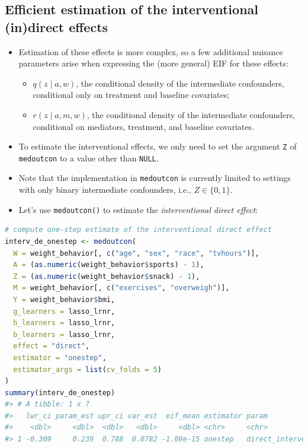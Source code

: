 \documentclass[
  12pt,
]{book}
\newcommand{\passthrough}[1]{#1}
\providecommand{\tightlist}{%
  \setlength{\itemsep}{0pt}\setlength{\parskip}{0pt}}
\theoremstyle{definition}
\theoremstyle{definition}
\theoremstyle{definition}
\newcommand{\1}{\mathbbm{1}}
\begin{document}
\hypertarget{efficient-estimation-of-the-interventional-indirect-effects}{%
\subsection{Efficient estimation of the interventional (in)direct effects}\label{efficient-estimation-of-the-interventional-indirect-effects}}

\begin{itemize}
\tightlist
\item
  Estimation of these effects is more complex, so a few additional nuisance
  parameters arise when expressing the (more general) EIF for these effects:

  \begin{itemize}
  \tightlist
  \item
    \(q(z \mid a, w)\), the conditional density of the intermediate confounders,
    conditional only on treatment and baseline covariates;
  \item
    \(r(z \mid a, m, w)\), the conditional density of the intermediate
    confounders, conditional on mediators, treatment, and baseline covariates.
  \end{itemize}
\item
  To estimate the interventional effects, we only need to set the argument \passthrough{\lstinline!Z!}
  of \passthrough{\lstinline!medoutcon!} to a value other than \passthrough{\lstinline!NULL!}.
\item
  Note that the implementation in \passthrough{\lstinline!medoutcon!} is currently limited to settings
  with only binary intermediate confounders, i.e., \(Z \in \{0, 1\}\).
\item
  Let's use \passthrough{\lstinline!medoutcon()!} to estimate the \emph{interventional direct effect}:
\end{itemize}

\begin{lstlisting}[language=R]
# compute one-step estimate of the interventional direct effect
interv_de_onestep <- medoutcon(
  W = weight_behavior[, c("age", "sex", "race", "tvhours")],
  A = (as.numeric(weight_behavior$sports) - 1),
  Z = (as.numeric(weight_behavior$snack) - 1),
  M = weight_behavior[, c("exercises", "overweigh")],
  Y = weight_behavior$bmi,
  g_learners = lasso_lrnr,
  h_learners = lasso_lrnr,
  b_learners = lasso_lrnr,
  effect = "direct",
  estimator = "onestep",
  estimator_args = list(cv_folds = 5)
)
summary(interv_de_onestep)
#> # A tibble: 1 x 7
#>   lwr_ci param_est upr_ci var_est  eif_mean estimator param                
#>    <dbl>     <dbl>  <dbl>   <dbl>     <dbl> <chr>     <chr>                
#> 1 -0.309     0.239  0.788  0.0782 -1.09e-15 onestep   direct_interventional
\end{lstlisting}
\end{document}
